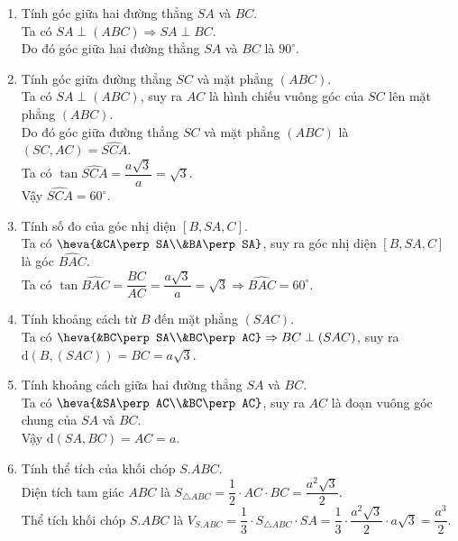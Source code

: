 \begin{bt}
{\begin{center}
		\end{center}
		\begin{enumerate}
			\item Tính góc giữa hai đường thẳng $SA$ và $BC$.\\
			Ta có $SA\perp (ABC)\Rightarrow SA\perp BC$.\\
			Do đó góc giữa hai đường thẳng $SA$ và $BC$ là $90^\circ$.
			\item Tính góc giữa đường thẳng $SC$ và mặt phẳng $(ABC)$.\\
			Ta có $SA\perp (ABC)$, suy ra $AC$ là hình chiếu vuông góc của $SC$ lên mặt phẳng $(ABC)$.\\
			Do đó góc giữa đường thẳng $SC$ và mặt phẳng $(ABC)$ là $(SC,AC)=\widehat{SCA}$.\\
			Ta có $\tan \widehat{SCA}=\dfrac{a\sqrt{3}}{a}=\sqrt{3}$.\\
			Vậy $\widehat{SCA}=60^\circ$.
			\item Tính số đo của góc nhị diện $[B,SA,C]$.\\
			Ta có $\heva{&CA\perp SA\\&BA\perp SA}$, suy ra góc nhị diện $[B,SA,C]$ là góc $\widehat{BAC}$.\\
			Ta có $\tan \widehat{BAC}=\dfrac{BC}{AC}=\dfrac{a\sqrt{3}}{a}=\sqrt{3}\Rightarrow \widehat{BAC}=60^\circ$.
			\item Tính khoảng cách từ $B$ đến mặt phẳng $(SAC)$.\\
			Ta có $\heva{&BC\perp SA\\&BC\perp AC}\Rightarrow BC\perp (SAC)$, suy ra $\mathrm{d}(B,(SAC))=BC=a\sqrt{3}$.
			\item Tính khoảng cách giữa hai đường thẳng $SA$ và $BC$.\\
			Ta có $\heva{&SA\perp AC\\&BC\perp AC}$, suy ra $AC$ là đoạn vuông góc chung của $SA$ và $BC$.\\
			Vậy $\mathrm{d}(SA,BC)=AC=a$.
			\item Tính thể tích của khối chóp $S.ABC$.\\
			Diện tích tam giác $ABC$ là $S_{\triangle {ABC}}=\dfrac{1}{2}\cdot AC\cdot BC=\dfrac{a^2\sqrt{3}}{2}$.\\
			Thể tích khối chóp $S.ABC$ là $V_{S.ABC}=\dfrac{1}{3}\cdot S_{\triangle {ABC}}\cdot SA=\dfrac{1}{3}\cdot \dfrac{a^2\sqrt{3}}{2}\cdot a\sqrt{3}=\dfrac{a^3}{2}$.
		\end{enumerate}
	}
\end{bt}

